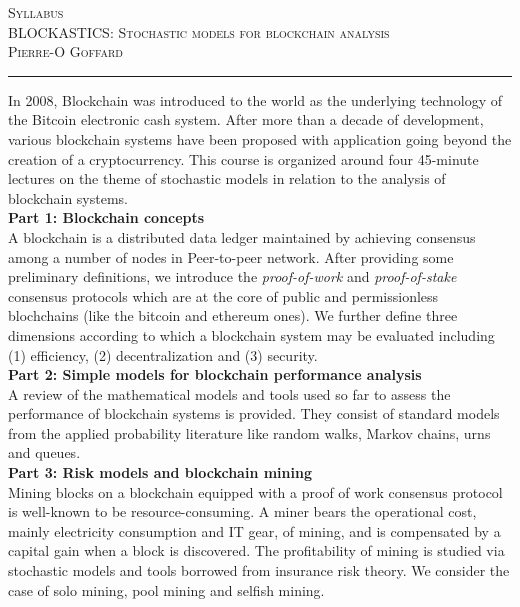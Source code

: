 \documentclass[11pt]{article}
\def\title{Syllabus}
\def\course{BLOCKASTICS: Stochastic models for blockchain analysis }
\def\profName{Pierre-O Goffard }
\begin{document}
{\center \textsc{\Large \title\\
	\large\course\\
	 \profName %
	}\\
	\vspace*{2em}
	\hrule
\vspace*{2em}}

In 2008, Blockchain was introduced to the world as the underlying technology of the Bitcoin electronic cash system. After more than a decade of development, various blockchain systems have been proposed with application going beyond the creation of a cryptocurrency. This course is organized around four 45-minute lectures on the theme of stochastic models in relation to the analysis of blockchain systems. 
\\

\noindent \textbf{Part 1: Blockchain concepts}\\
\noindent A blockchain is a distributed data ledger maintained by achieving consensus among a number of nodes in Peer-to-peer network. After providing some preliminary definitions, we introduce the \textit{proof-of-work} and \textit{proof-of-stake} consensus protocols which are at the core of public and permissionless blochchains (like the bitcoin and ethereum ones). We further define three dimensions according to which a blockchain system may be evaluated including (1) efficiency, (2) decentralization and (3) security.    
\\

\noindent \textbf{Part 2: Simple models for blockchain performance analysis}\\
\noindent A review of the mathematical models and tools used so far to assess the performance of blockchain systems is provided. They consist of standard models from the applied probability literature like random walks, Markov chains, urns and queues.
\\

\noindent \textbf{Part 3: Risk models and blockchain mining}\\
\noindent Mining blocks on a blockchain equipped with a proof of work consensus protocol is well-known to be resource-consuming. A miner bears the operational cost, mainly
electricity consumption and IT gear, of mining, and is compensated by a capital gain when a block is discovered. The profitability of mining is studied via stochastic models and tools borrowed from insurance risk theory. We consider the case of solo mining, pool mining and selfish mining.    
\\
\end{document}
